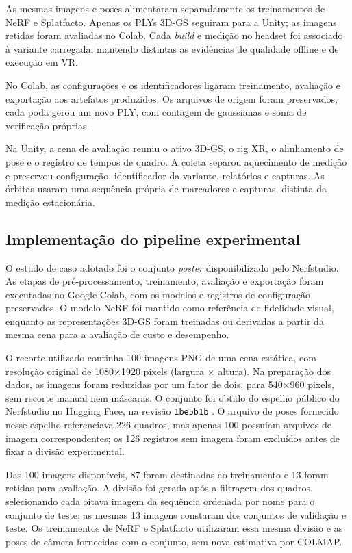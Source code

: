 As mesmas imagens e poses alimentaram separadamente os treinamentos de NeRF e Splatfacto. Apenas os PLYs 3D-GS seguiram para a Unity; as imagens retidas foram avaliadas no Colab. Cada \textit{build} e medição no headset foi associado à variante carregada, mantendo distintas as evidências de qualidade offline e de execução em VR.

No Colab, as configurações e os identificadores ligaram treinamento, avaliação e exportação aos artefatos produzidos. Os arquivos de origem foram preservados; cada poda gerou um novo PLY, com contagem de gaussianas e soma de verificação próprias.

Na Unity, a cena de avaliação reuniu o ativo 3D-GS, o rig XR, o alinhamento de pose e o registro de tempos de quadro. A coleta separou aquecimento de medição e preservou configuração, identificador da variante, relatórios e capturas. As órbitas usaram uma sequência própria de marcadores e capturas, distinta da medição estacionária.

\subsection{Implementação do pipeline experimental}

O estudo de caso adotado foi o conjunto \textit{poster} disponibilizado pelo Nerfstudio. As etapas de pré-processamento, treinamento, avaliação e exportação foram executadas no Google Colab, com os modelos e registros de configuração preservados. O modelo NeRF foi mantido como referência de fidelidade visual, enquanto as representações 3D-GS foram treinadas ou derivadas a partir da mesma cena para a avaliação de custo e desempenho.

O recorte utilizado continha 100 imagens PNG de uma cena estática, com resolução original de 1080$\times$1920 pixels (largura $\times$ altura). Na preparação dos dados, as imagens foram reduzidas por um fator de dois, para 540$\times$960 pixels, sem recorte manual nem máscaras. O conjunto foi obtido do espelho público do Nerfstudio no Hugging Face, na revisão \texttt{1be5b1b} \cite{nerfstudioPosterDataset}. O arquivo de poses fornecido nesse espelho referenciava 226 quadros, mas apenas 100 possuíam arquivos de imagem correspondentes; os 126 registros sem imagem foram excluídos antes de fixar a divisão experimental.

Das 100 imagens disponíveis, 87 foram destinadas ao treinamento e 13 foram retidas para avaliação. A divisão foi gerada após a filtragem dos quadros, selecionando cada oitava imagem da sequência ordenada por nome para o conjunto de teste; as mesmas 13 imagens constaram dos conjuntos de validação e teste. Os treinamentos de NeRF e Splatfacto utilizaram essa mesma divisão e as poses de câmera fornecidas com o conjunto, sem nova estimativa por COLMAP.

